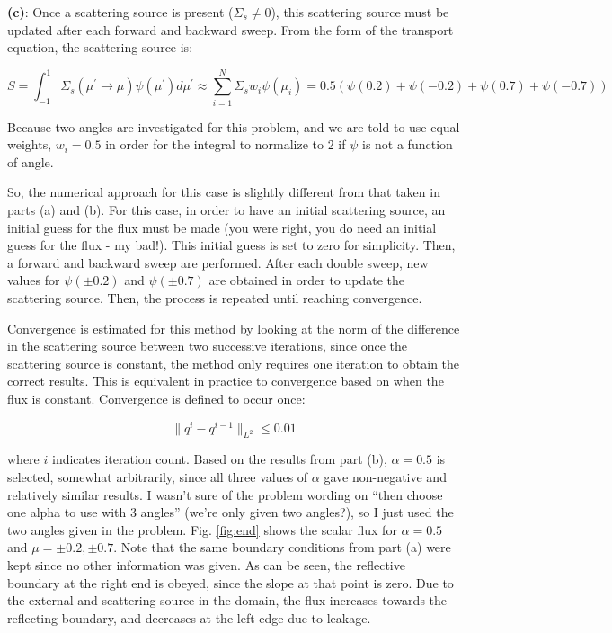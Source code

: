 \documentclass[10pt]{article}
\begin{document}
\textbf{(c)}: Once a scattering source is present (\(\Sigma_s\neq0\)), this scattering source must be updated after each forward and backward sweep. From the form of the transport equation, the scattering source is:

\begin{equation}
S=\int_{-1}^{1}\Sigma_s(\mu^{'}\rightarrow\mu)\psi(\mu^{'})d\mu^{'}\approx\sum_{i=1}^N\Sigma_sw_i\psi(\mu_i)=0.5(\psi(0.2)+\psi(-0.2)+\psi(0.7)+\psi(-0.7))
\end{equation}

Because two angles are investigated for this problem, and we are told to use equal weights, \(w_i=0.5\) in order for the integral to normalize to 2 if \(\psi\) is not a function of angle. 

So, the numerical approach for this case is slightly different from that taken in parts (a) and (b). For this case, in order to have an initial scattering source, an initial guess for the flux must be made (you were right, you do need an initial guess for the flux - my bad!). This initial guess is set to zero for simplicity. Then, a forward and backward sweep are performed. After each double sweep, new values for \(\psi(\pm0.2)\) and \(\psi(\pm0.7)\) are obtained in order to update the scattering source. Then, the process is repeated until reaching convergence.

Convergence is estimated for this method by looking at the norm of the difference in the scattering source between two successive iterations, since once the scattering source is constant, the method only requires one iteration to obtain the correct results. This is equivalent in practice to convergence based on when the flux is constant. Convergence is defined to occur once:

\begin{equation}
\|q^{i}-q^{i-1}\|_{L^2}\leq0.01
\end{equation}

where \(i\) indicates iteration count. Based on the results from part (b), \(\alpha=0.5\) is selected, somewhat arbitrarily, since all three values of \(\alpha\) gave non-negative and relatively similar results. I wasn't sure of the problem wording on ``then choose one alpha to use with 3 angles'' (we're only given two angles?), so I just used the two angles given in the problem. Fig. \ref{fig:end} shows the scalar flux for \(\alpha=0.5\) and \(\mu=\pm0.2, \pm0.7\). Note that the same boundary conditions from part (a) were kept since no other information was given. As can be seen, the reflective boundary at the right end is obeyed, since the slope at that point is zero. Due to the external and scattering source in the domain, the flux increases towards the reflecting boundary, and decreases at the left edge due to leakage.
\end{document}
